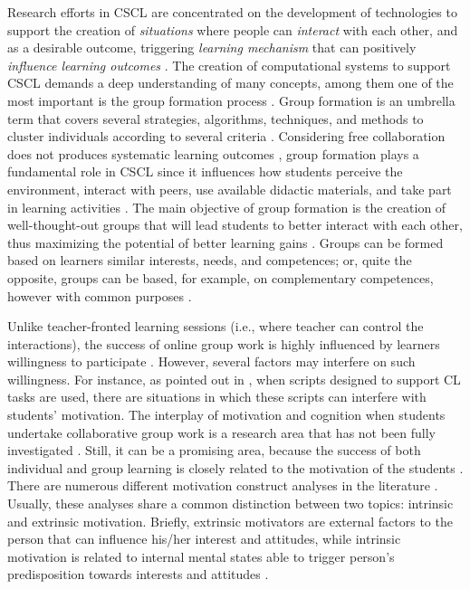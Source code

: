 Research efforts in CSCL are concentrated on the development of technologies to support the creation of \textit{situations} where people can \textit{interact} with each other, and as a desirable outcome, triggering \textit{learning mechanism} that can positively \textit{influence learning outcomes} \cite{What_do_you_mean_by}. 
The creation of computational systems to support CSCL demands a deep understanding of many concepts, among them one of the most important is the group formation process \cite{An_ontology_engineering_approach}. 
Group formation is an umbrella term that covers several strategies, algorithms, techniques, and methods to cluster individuals according to several criteria \cite{Group_Formation_Algorithms}. 
Considering free collaboration does not produces systematic learning outcomes \cite{An_ontology_engineering_approach}, group formation plays a fundamental role in CSCL since it influences how students perceive the environment, interact with peers, use available didactic materials, and take part in learning activities \cite{Over-scripting_CSCL}. 
The main objective of  group formation is the creation of well-thought-out groups that will lead students to better interact with each other, thus maximizing the potential of better learning gains \cite{Designing_for_interaction,Collaborative_Learning_Techniques}. 
Groups can be formed based on learners similar interests, needs, and competences; or, quite the opposite, groups can be based, for example, on complementary competences, however with common purposes \cite{Specifying_computer_supported_collaboration_scripts}. 

Unlike teacher-fronted learning sessions (i.e., where teacher can control the interactions), the success of online group work is highly influenced by learners willingness to participate \cite{Causal_Relationships_Between}. 
However, several factors may interfere on such willingness. For instance, as pointed out in \cite{Gamification_of_Collaborative_Learning}, when scripts designed to support CL tasks are used, there are situations in which  these scripts can interfere with students’ motivation. 
The interplay of motivation and cognition when students undertake collaborative group work is a research area that has not been fully investigated \cite{The_interrelationship_of_emotion_and_cognition}. 
Still, it can be a promising area, because the success of both individual and group learning is closely related to the motivation of the students \cite{Computer_supported_team_based_learning}. 
There are numerous different motivation construct analyses in the literature \cite{Self-determination_theory_and_the_facilitation}.
Usually, these analyses share a common distinction between two topics: intrinsic and extrinsic motivation. Briefly, extrinsic motivators are external factors to the person that can influence his/her interest and attitudes, while intrinsic motivation is related to internal mental states able to trigger person’s predisposition towards interests and attitudes \cite{Beyond_Talk_Creating_Autonomous_Motivation}.

